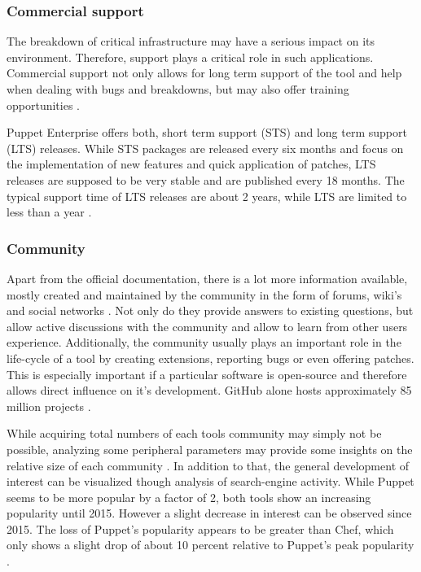 \subsubsection{Commercial support}

The breakdown of critical infrastructure may have a serious impact on its environment. Therefore, support plays a critical role in such applications. Commercial support not only allows for long term support of the tool and help when dealing with bugs and breakdowns, but may also offer training opportunities \cite{delaet2010survey}.

Puppet Enterprise offers both, short term support (STS) and long term support (LTS) releases. While STS packages are released every six months and focus on the implementation of new features and quick application of patches, LTS releases are supposed to be very stable and are published every 18 months. The typical support time of LTS releases are about 2 years, while LTS are limited to less than a year \cite{puppetcomenterpriselifecycle}.



\subsubsection{Community}

Apart from the official documentation, there is a lot more information available, mostly created and maintained by the community in the form of forums, wiki's and social networks \cite{delaet2010survey}. Not only do they provide answers to existing questions, but allow active discussions with the community and allow to learn from other users experience. Additionally, the community usually plays an important role in the life-cycle of a tool by creating extensions, reporting bugs or even offering patches. This is especially important if a particular software is open-source and therefore allows direct influence on it's development. GitHub alone hosts approximately 85 million projects \cite{githubabout}.

While acquiring total numbers of each tools community may simply not be possible, analyzing some peripheral parameters may provide some insights on the relative size of each community \cite{pandey2012investigating}. In addition to that, the general development of interest can be visualized though analysis of search-engine activity. While Puppet seems to be more popular by a factor of 2, both tools show an increasing popularity until 2015. However a slight decrease in interest can be observed since 2015. The loss of Puppet's popularity appears to be greater than Chef, which only shows a slight drop of about 10 percent relative to Puppet's peak popularity \cite{googlepuppetvschef}.
